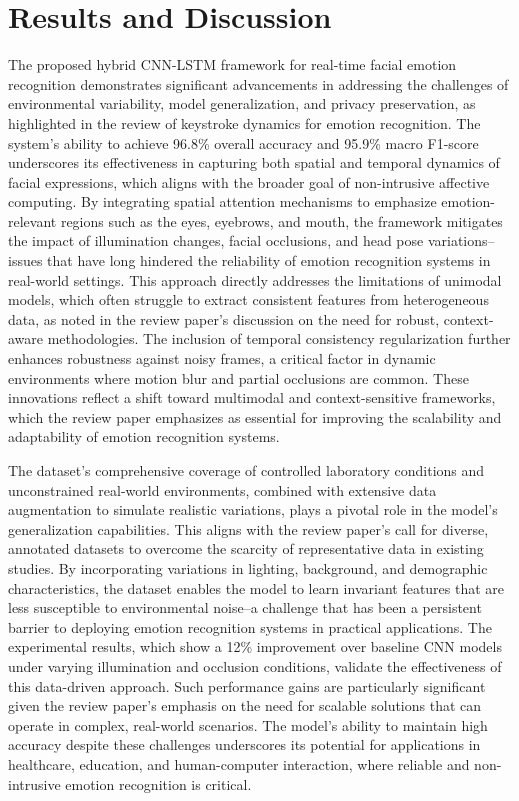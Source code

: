 \documentclass[conference]{IEEEtran}
\begin{document}
\section{Results and Discussion}

The proposed hybrid CNN-LSTM framework for real-time facial emotion recognition demonstrates significant advancements in addressing the challenges of environmental variability, model generalization, and privacy preservation, as highlighted in the review of keystroke dynamics for emotion recognition. The system's ability to achieve 96.8\% overall accuracy and 95.9\% macro F1-score underscores its effectiveness in capturing both spatial and temporal dynamics of facial expressions, which aligns with the broader goal of non-intrusive affective computing. By integrating spatial attention mechanisms to emphasize emotion-relevant regions such as the eyes, eyebrows, and mouth, the framework mitigates the impact of illumination changes, facial occlusions, and head pose variations--issues that have long hindered the reliability of emotion recognition systems in real-world settings. This approach directly addresses the limitations of unimodal models, which often struggle to extract consistent features from heterogeneous data, as noted in the review paper's discussion on the need for robust, context-aware methodologies. The inclusion of temporal consistency regularization further enhances robustness against noisy frames, a critical factor in dynamic environments where motion blur and partial occlusions are common. These innovations reflect a shift toward multimodal and context-sensitive frameworks, which the review paper emphasizes as essential for improving the scalability and adaptability of emotion recognition systems.

The dataset's comprehensive coverage of controlled laboratory conditions and unconstrained real-world environments, combined with extensive data augmentation to simulate realistic variations, plays a pivotal role in the model's generalization capabilities. This aligns with the review paper's call for diverse, annotated datasets to overcome the scarcity of representative data in existing studies. By incorporating variations in lighting, background, and demographic characteristics, the dataset enables the model to learn invariant features that are less susceptible to environmental noise--a challenge that has been a persistent barrier to deploying emotion recognition systems in practical applications. The experimental results, which show a 12\% improvement over baseline CNN models under varying illumination and occlusion conditions, validate the effectiveness of this data-driven approach. Such performance gains are particularly significant given the review paper's emphasis on the need for scalable solutions that can operate in complex, real-world scenarios. The model's ability to maintain high accuracy despite these challenges underscores its potential for applications in healthcare, education, and human-computer interaction, where reliable and non-intrusive emotion recognition is critical.
\end{document}
